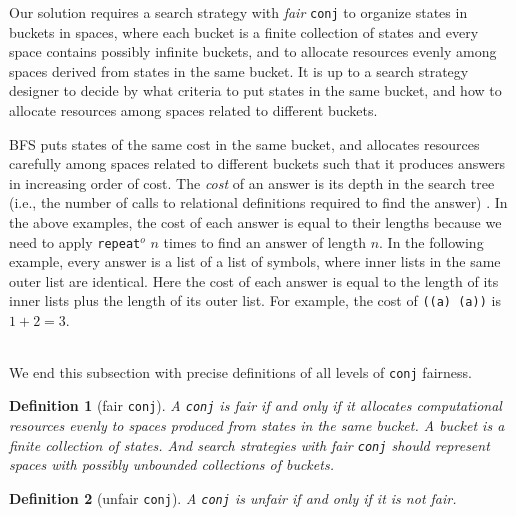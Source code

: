 \documentclass[format=acmlarge, review=false, authordraft=false]{acmart}
\newcommand{\conj}{\texttt{conj}}
\newcommand{\repeato}{\texttt{repeat$^o$}}
\newcommand{\BFS}[0]{BFS}
\newtheorem{defn}{Definition}[section]
\begin{document}
\begin{center}
	\begin{tabular}{c}
		
	\end{tabular}
\end{center}

Our solution requires a search strategy with \emph{fair} \conj{} to organize
states in buckets in spaces, where each bucket is a finite collection of states
and every space contains possibly infinite buckets,
and 
to allocate resources evenly among spaces derived from states in the 
same bucket. It is up to a search strategy designer to decide by what criteria 
to 
put states in the same bucket, and how to allocate resources among spaces 
related to different buckets.

\BFS{} puts states of the same cost in the same bucket, and allocates
resources carefully among spaces related to different buckets such
that it produces answers in increasing order of cost. The \emph{cost}
of an answer is its depth in the search tree (i.e., the number of
calls to relational definitions required to find the answer) 
\citep{seres1999algebra}. In the above examples, the cost of each answer is 
equal to their lengths because we need to apply \repeato{} $n$ times to find an 
answer of length $n$. In the following example, every answer is a list of a 
list of symbols, where inner lists in the same outer list are identical. Here 
the cost of each answer is equal to the length of its inner lists plus the 
length of its outer list. For example, the cost of \texttt{((a) (a))} is $1 + 2 
= 3$.

\begin{center}
	\begin{tabular}{c}
		
	\end{tabular}
\end{center}
 
We end this subsection with precise definitions of all levels of \conj{} 
fairness.

\begin{defn}[fair \conj{}]
A \conj{} is fair if and only if it allocates computational resources evenly to 
spaces produced from states in the same bucket. A bucket is a finite 
collection of states. And search strategies with fair \conj{} should represent 
spaces with possibly unbounded collections of buckets. 
\end{defn}

\begin{defn}[unfair \conj{}]
A \conj{} is unfair if and only if it is not fair.
\end{defn}
\end{document}

